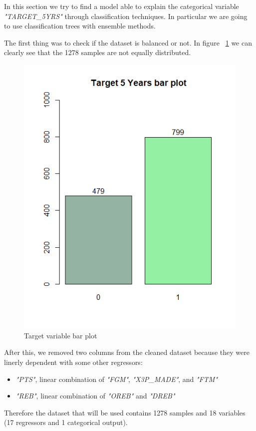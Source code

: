 In this section we try to find a model able to explain the categorical variable \textit{"TARGET\_5YRS"} through classification techniques.
In particular we are going to use classification trees with ensemble methods.

The first thing was to check if the dataset is balanced or not. In figure \Fig~\ref{fig:target_bar_plot} we can clearly see that the 1278 samples are not equally distributed. 

\begin{figure}[h]
	\centering
	\includegraphics[width=0.5\linewidth]{ImageFiles/Classification/target_bar_plot}
	\caption{Target variable bar plot}
	\label{fig:target_bar_plot}
\end{figure}

After this, we removed two columns from the cleaned dataset because they were linerly dependent with some other regressors:
\begin{itemize}
	\item \textit{"PTS"}, linear combination of \textit{"FGM"}, \textit{"X3P\_MADE"}, and \textit{"FTM"}
	\item \textit{"REB"}, linear combination of \textit{"OREB"} and \textit{"DREB"}
\end{itemize}

Therefore the dataset that will be used contains 1278 samples and 18 variables (17 regressors and 1 categorical output).
